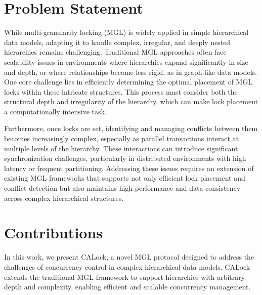 

\section{Problem Statement}
While multi-granularity locking (MGL) is widely applied in simple hierarchical data models, adapting it to handle complex, irregular, and deeply nested hierarchies remains challenging. Traditional MGL approaches often face scalability issues in environments where hierarchies expand significantly in size and depth, or where relationships become less rigid, as in graph-like data models. One core challenge lies in efficiently determining the optimal placement of MGL locks within these intricate structures. This process must consider both the structural depth and irregularity of the hierarchy, which can make lock placement a computationally intensive task.

Furthermore, once locks are set, identifying and managing conflicts between them becomes increasingly complex, especially as parallel transactions interact at multiple levels of the hierarchy. These interactions can introduce significant synchronization challenges, particularly in distributed environments with high latency or frequent partitioning. Addressing these issues requires an extension of existing MGL frameworks that supports not only efficient lock placement and conflict detection but also maintains high performance and data consistency across complex hierarchical structures.


\section{Contributions}

In this work, we present CALock, a novel MGL protocol designed to address the challenges of concurrency control in complex hierarchical data models. CALock extends the traditional MGL framework to support hierarchies with arbitrary depth and complexity, enabling efficient and scalable concurrency management.

